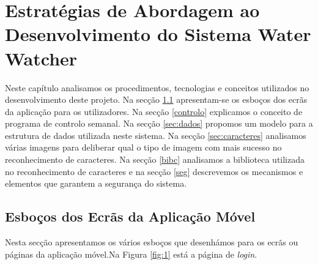 \chapter{Estratégias de Abordagem ao Desenvolvimento do Sistema Water Watcher} \label{cap:abordagem}
Neste capítulo analisamos os procedimentos, tecnologias e conceitos utilizados no desenvolvimento deste projeto. Na secção \ref{sec:ecra} apresentam-se os esboços dos ecrãs da aplicação para os utilizadores. Na secção \ref{controlo} explicamos o conceito de programa de controlo semanal. Na secção \ref{sec:dados} propomos um modelo para a estrutura de dados utilizada neste sistema. Na secção \ref{sec:caracteres} analisamos várias imagens para deliberar qual o tipo de imagem com mais sucesso no reconhecimento de caracteres. Na secção \ref{bibc} analisamos a biblioteca utilizada no reconhecimento de caracteres e na secção \ref{seg} descrevemos os mecanismos e elementos que garantem a segurança do sistema.


\section{Esboços dos Ecrãs da Aplicação Móvel} \label{sec:ecra}
Nesta secção apresentamos os vários esboços que desenhámos para os ecrãs ou páginas da aplicação móvel.Na Figura \ref{fig:1} está a página de \textit{login}.


